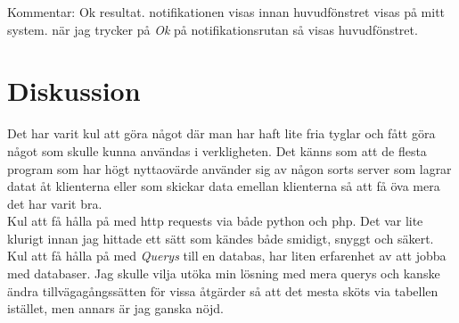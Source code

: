 \documentclass[11pt, titlepage, oneside, a4paper]{article}
\newcommand{\Section}[1]{\section{#1}\vspace{-8pt}}
\begin{document}
        Kommentar: Ok resultat. notifikationen visas innan huvudfönstret visas på mitt system. när jag trycker på \emph{Ok} på notifikationsrutan så visas huvudfönstret.
        
        
        \Section{Diskussion}
        
        Det har varit kul att göra något där man har haft lite fria tyglar och fått göra något som skulle kunna användas i verkligheten.
        Det känns som att de flesta program som har högt nyttaovärde använder sig av någon sorts server som lagrar datat åt klienterna eller som skickar data emellan klienterna så att få öva mera det har varit bra. \\
        Kul att få hålla på med http requests via både python och php. Det var lite klurigt innan jag hittade ett sätt som kändes både smidigt, snyggt och säkert. Kul att få hålla på med \emph{Querys} till en databas, har liten erfarenhet av att jobba med databaser. Jag skulle vilja utöka min lösning med mera querys och kanske ändra tillvägagångssätten för vissa åtgärder så att det mesta sköts via tabellen istället, men annars är jag ganska nöjd.
        
\end{document}
